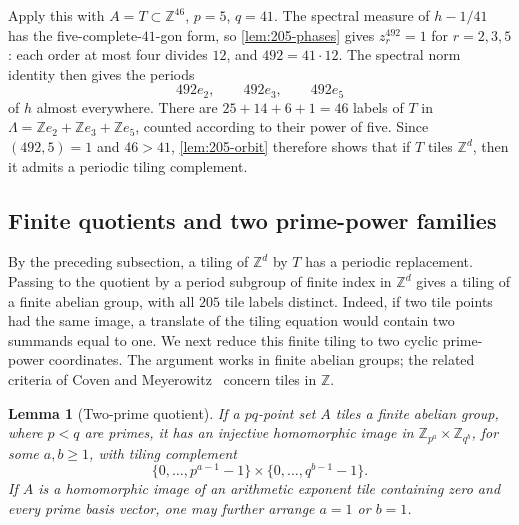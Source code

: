 \documentclass[11pt,reqno]{amsart}
\newcommand{\Z}{\mathbb Z}
\newtheorem{lemma}[theorem]{Lemma}
\theoremstyle{definition}
\theoremstyle{remark}
\numberwithin{equation}{section}
\begin{document}
Apply this with $A=T\subset\Z^{46}$, $p=5$, $q=41$. The spectral
measure of $h-1/41$ has the five-complete-$41$-gon form, so
\cref{lem:205-phases} gives $z_r^{492}=1$ for $r=2,3,5$:
each order at most four divides $12$, and $492=41\cdot12$.
The spectral norm identity then gives the periods
\[
 492e_2,\qquad492e_3,\qquad492e_5
\]
of $h$ almost everywhere. There are $25+14+6+1=46$ labels of $T$
in $\Lambda=\Z e_2+\Z e_3+\Z e_5$, counted according to their
power of five. Since $(492,5)=1$ and $46>41$,
\cref{lem:205-orbit} therefore shows that if $T$ tiles $\Z^d$, then
it admits a periodic tiling complement.

\subsection{Finite quotients and two prime-power families}\label{sec:205-quotients}

By the preceding subsection, a tiling of $\Z^d$ by $T$ has a periodic
replacement. Passing to the quotient by a period subgroup of finite
index in $\Z^d$ gives a tiling of a finite abelian group, with all
$205$ tile labels distinct.
Indeed, if two tile points had the same image, a translate of the
tiling equation would contain two summands equal to one.
We next reduce this finite tiling to two cyclic prime-power coordinates.
The argument works in finite abelian groups; the related criteria
of Coven and Meyerowitz~\cite{CM} concern tiles in $\Z$.

\begin{lemma}[Two-prime quotient]\label{lem:205-pq-quotient}
If a $pq$-point set $A$ tiles a finite abelian group, where $p<q$ are
primes, it has an injective homomorphic image in
$\Z_{p^a}\times\Z_{q^b}$, for some $a,b\ge1$, with tiling complement
\begin{equation}\label{eq:205-box}
 \{0,\ldots,p^{a-1}-1\}\times\{0,\ldots,q^{b-1}-1\}.
\end{equation}
If $A$ is a homomorphic image of an arithmetic exponent tile containing
zero and every prime basis vector, one may further arrange $a=1$ or $b=1$.
\end{lemma}
\end{document}
